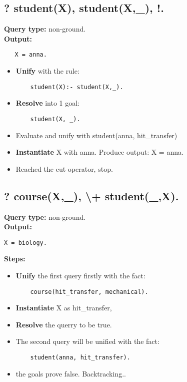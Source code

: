 \subsection{? student(X), student(X,\_), !.}
\textbf{Query type: } non-ground. \\
\textbf{Output:} 
\begin{lstlisting}
   X = anna. 
\end{lstlisting}

\begin{itemize}
    \item \textbf{Unify} with the rule:
    \begin{lstlisting}
    student(X):- student(X,_).
    \end{lstlisting}
    \item \textbf{Resolve} into 1 goal:
    \begin{lstlisting}
    student(X, _).
    \end{lstlisting}
    \item Evaluate and unify with student(anna, hit\_transfer)
    \item \textbf{Instantiate} X with anna. Produce output: X = anna.
    \item Reached the cut operator, stop.
\end{itemize}

\subsection{? course(X,\_), \textbackslash+ student(\_,X). } 
\textbf{Query type: } non-ground. \\
\textbf{Output:} 
\begin{lstlisting}
X = biology.
\end{lstlisting}

\textbf{Steps:}
\begin{itemize}
    \item \textbf{Unify} the first query firstly with the fact:
    \begin{lstlisting}
    course(hit_transfer, mechanical).
    \end{lstlisting}
    \item \textbf{Instantiate} X as hit\_transfer, 
    \item \textbf{Resolve} the querry to be true.
    \item The second query will be unified with the fact:
    \begin{lstlisting}
    student(anna, hit_transfer).
    \end{lstlisting}
    \item the goals prove false. Backtracking..
\end{itemize}

